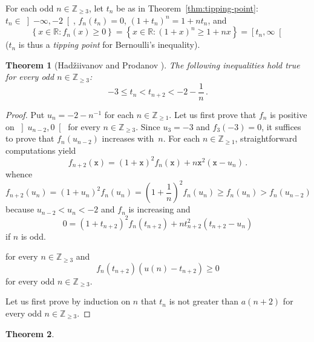 \documentclass[12pt]{article}
\newcommand{\bZ}{\mathbb{Z}}
\newcommand{\bR}{\mathbb{R}}
\newcommand{\bN}[1]{\bZ_{\ge #1}}
\newcommand{\ttx}{\mathtt{x}}
\newtheorem{theorem}{Theorem}
\begin{document}
 For each odd $n \in \bN{3}$,
 let $t_n$ be as in Theorem~\ref{thm:tipping-point}:
 $t_n \in \left]- \infty, - 2 \right[$, $f_n(t_n) = 0$, ${(1 + t_n)}^n = 1 + n t_n$,
 and 
 $$
 \left\{ x \in \bR : f_n(x) \ge 0 \right\}
 = \left\{ x \in \bR : {(1 + x)}^n \ge 1 + n x  \right\}
 = \left[t_n, \infty \right[ 
 $$
 ($t_n$ is thus a \emph{tipping point} for Bernoulli's inequality).
  
 


 \begin{theorem} [Had\v{z}iivanov and Prodanov \cite{MitrinovicAI,MitrinovicCNIA}] \label{thm:bulgare}
   The following inequalities hold true for every odd $n \in \bN{3}$:
   $$ - 3 \le t_n < t_{n + 2} < - 2 - \frac{1}{n} \,.
   $$
 \end{theorem}
 
 \begin{proof}
   Put $u_n = - 2 - n^{-1}$ for each $n \in \bN{1}$.
   Let us first prove that $f_n$ is positive on $\left]u_{n - 2}, 0 \right[$ for every $n \in \bN{3}$.
   Since $u_3 = - 3$ and $f_3(- 3) = 0$, it suffices to prove that $f_n(u_{n - 2})$ increases with~$n$.
   For each $n \in \bN{1}$, straightforward computations yield 
   $$
   f_{n + 2} (\ttx) = {(1 + \ttx)}^2 f_n(\ttx) + n \ttx^2 (\ttx - u_n) \,.
   $$
   whence
   $$
   f_{n + 2}(u_n)
   =
   {(1 + u_n )}^2 f_n(u_n)
   =
   {\left(1 + \frac{1}{n} \right)}^2 f_n(u_n)
   \ge
   f_n(u_n)
   >
   f_n(u_{n - 2})
   $$
   because $u_{n - 2} < u_n < - 2$ and $f_n$ is increasing 
   and
   $$
   0 = {(1 + t_{n + 2})}^2 f_n(t_{n + 2}) +  n t_{n + 2}^2 (t_{n + 2} - u_n)  
   $$
   if $n$ is odd.
   

   
   
 for every $n \in \bN{3}$ and
 $$
 f_n(t_{n + 2})  (u(n) - t_{n + 2})  \ge 0
 $$
 for every odd $n \in \bN{3}$.
 
   Let us first prove by induction on $n$ that $t_n$ is not greater than $a(n + 2)$ for every odd $n \in \bN{3}$.
   
 \end{proof}
 \begin{theorem}
   \label{lem:odd-two-roots}

 \end{theorem}
\end{document}
